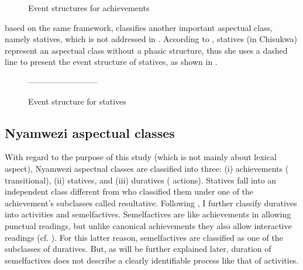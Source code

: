 \documentclass[output=paper,newtxmath,modfonts,nonflat,draftmode]{langsci/langscibook}
\begin{document}
\begin{figure}
\caption{Event structures for achievements \citep[33]{Botne2010}} 
\label{fig:kanijo:3}
\end{figure}


\citet[62]{Kershner2002} based on the same framework, classifies another important aspectual class, namely statives, which is not addressed in \citet{Botne2010}. According to \citet{Kershner2002}, statives (in Chisukwa) represent an aspectual class without a phasic structure, thus she uses a dashed line to present the event structure of statives, as shown in . 

\begin{figure}
--------------------------
\caption{Event structure for statives \citep[62]{Kershner2002}\label{fig:kanijo:4}}
\end{figure}

\subsection{Nyamwezi aspectual classes}

With regard to the purpose of this study (which is not mainly about lexical aspect), Nyamwezi aspectual classes are classified into three: (i) achievements ( transitional), (ii) statives, and (iii) duratives ( actions). Statives fall into an independent class different from \citet{Botne2010} who classified them under one of the achievement’s subclasses called resultative. Following \citet{Botne2010}, I further classify duratives into activities and semelfactives. Semelfactives are like achievements in allowing punctual readings, but unlike canonical achievements they also allow interactive readings (cf. \citealt{Kearns2000}). For this latter reason, semelfactives are classified as one of the subclasses of duratives. But, as will be further explained later, duration of semelfactives does not describe a clearly identifiable process like that of activities. 
\end{document}
